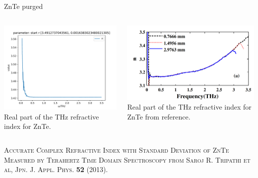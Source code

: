 \documentclass[aspectratio=1610, 9pt]{beamer}
\begin{document}
\begin{frame}{}
  ZnTe purged
  \begin{columns}
    \begin{column}{0.5\textwidth}
      \includegraphics[width=\textwidth]{images/ZnTe1mm_purged_nofilter/frequncy_against_n_k.pdf}
      {Real part of the THz refractive index for ZnTe.}
    \end{column} 
    \begin{column}{0.5\textwidth}
      \includegraphics[width=\textwidth]{images/nZnTe.png}
      {Real part of the THz refractive index for ZnTe from reference.}
    \end{column}
  \end{columns}
  \textsc{\textcolor{tugreen}{Accurate Complex Refractive Index with Standard
  Deviation of ZnTe Measured by Terahertz Time
  Domain Spectroscopy} from Saroj R. Tripathi
  et al, Jpn. J. Appl. Phys. \textbf{52} (2013).}
\end{frame}
\end{document}
